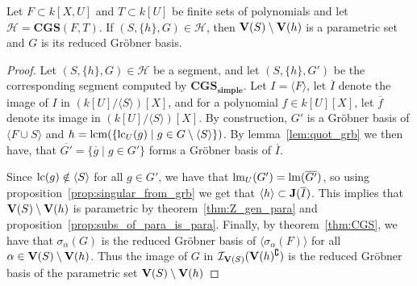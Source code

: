 \begin{theorem}\label{thm:segs_are_para}
  Let $F \subset k[X, U]$ and $T \subset k[U]$ be finite sets of polynomials and let $\mathcal H = \mathbf{CGS}(F, T)$. If $(S, \{h\}, G) \in \mathcal H$, then $\operatorname{\mathbf V}(S) \setminus \operatorname{\mathbf V}(h)$ is a parametric set and $G$ is its reduced Gröbner basis.
\end{theorem}
\begin{proof}
  Let $(S, \{h\}, G) \in \mathcal H$ be a segment, and let $(S, \{h\}, G')$ be the corresponding segment computed by $\mathbf{CGS_{simple}}$. Let $I = \langle F \rangle$, let $\overline I$ denote the image of $I$ in $(k[U]/\langle S \rangle)[X]$, and for a polynomial $f \in k[U][X]$, let $\overline f$ denote its image in $(k[U]/\langle S \rangle)[X]$. By construction, $G'$ is a Gröbner basis of $\langle F \cup S \rangle$ and $h = \operatorname{lcm}(\{\operatorname{lc}_{U}(g) \mid g \in G \setminus \langle S \rangle\})$. By lemma~\ref{lem:quot_grb} we then have, that $\overline{G'} = \{\overline g \mid g \in G'\}$ forms a Gröbner basis of $\overline I$.

  Since $\operatorname{lc}(g) \notin \langle S \rangle$ for all $g \in G'$, we have that $\operatorname{lm}_{U}(G') = \operatorname{lm}(\overline{G'})$, so using proposition~\ref{prop:singular_from_grb} we get that $\langle h \rangle \subset \operatorname{\mathbf J}(\overline I)$. This implies that $\operatorname{\mathbf V}(S) \setminus \operatorname{\mathbf V}(h)$ is parametric by theorem~\ref{thm:Z_gen_para} and proposition~\ref{prop:subs_of_para_is_para}. Finally, by theorem~\ref{thm:CGS}, we have that $\sigma_{\alpha}(G)$ is the reduced Gröbner basis of $\langle \sigma_{\alpha}(F) \rangle$ for all $\alpha \in \operatorname{\mathbf V}(S) \setminus \operatorname{\mathbf V}(h)$. Thus the image of $G$ in $\mathcal I_{\operatorname{\mathbf V}(S)}(\operatorname{\mathbf V}(h)^{\complement})$ is the reduced Gröbner basis of the parametric set $\operatorname{\mathbf V}(S) \setminus \operatorname{\mathbf V}(h)$
\end{proof}
